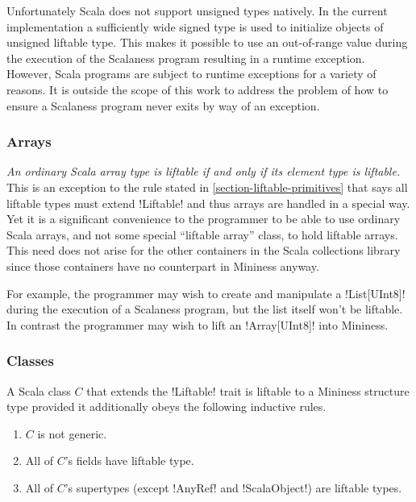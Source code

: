 Unfortunately Scala does not support unsigned types natively. In the current implementation a
sufficiently wide signed type is used to initialize objects of unsigned liftable type. This
makes it possible to use an out-of-range value during the execution of the Scalaness program
resulting in a runtime exception. However, Scala programs are subject to runtime exceptions for
a variety of reasons. It is outside the scope of this work to address the problem of how to
ensure a Scalaness program never exits by way of an exception.

\subsubsection{Arrays}
\label{section-liftable-arrays}

\emph{An ordinary Scala array type is liftable if and only if its element type is liftable.}
This is an exception to the rule stated in \autoref{section-liftable-primitives} that says all
liftable types must extend !Liftable! and thus arrays are handled in a special way. Yet it is a
significant convenience to the programmer to be able to use ordinary Scala arrays, and not some
special ``liftable array'' class, to hold liftable arrays. This need does not arise for the
other containers in the Scala collections library since those containers have no counterpart in
Mininess anyway.

For example, the programmer may wish to create and manipulate a !List[UInt8]! during the
execution of a Scalaness program, but the list itself won't be liftable. In contrast the
programmer may wish to lift an !Array[UInt8]! into Mininess.

\subsubsection{Classes}
\label{section-liftable-classes}

A Scala class $C$ that extends the !Liftable! trait is liftable to a Mininess structure type
provided it additionally obeys the following inductive rules.

\begin{enumerate}
\item $C$ is not generic.
\item All of $C$'s fields have liftable type.
\item All of $C$'s supertypes (except !AnyRef! and !ScalaObject!) are liftable types.
\end{enumerate}

